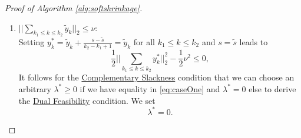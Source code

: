 \begin{proof}[Proof of Algorithm \ref{alg:softshrinkage}]
                \begin{enumerate}
                    \item $||\sum\limits_{k_{1} \le k \le k_{2}} \tilde{y}_{k}||_{2} \le \nu$:\\
                    Setting $y^{\ast}_{k} = \tilde{y}_{k} + \frac{s - \tilde{s}}{k_{2} - k_{1} + 1} = \tilde{y}_{k}$ for all $k_{1} \le k \le k_{2}$ and $s = \tilde{s}$ leads to
                        \begin{equation}
                            \frac{1}{2} ||\sum_{k_{1} \le k \le k_{2}} y^{\ast}_{k}||_{2}^{2} - \frac{1}{2} \nu^{2} \le 0, \label{eq:caseOne}
                        \end{equation}
                    It follows for the \underline{Complementary Slackness} condition that we can choose an arbitrary $\lambda^{\ast} \ge 0$ if we have equality in \ref{eq:caseOne} and $\lambda^{\ast} = 0$ else to derive the \underline{Dual Feasibility} condition. We set
                        $$\lambda^{\ast} = 0.$$


\end{enumerate}
\end{proof}
